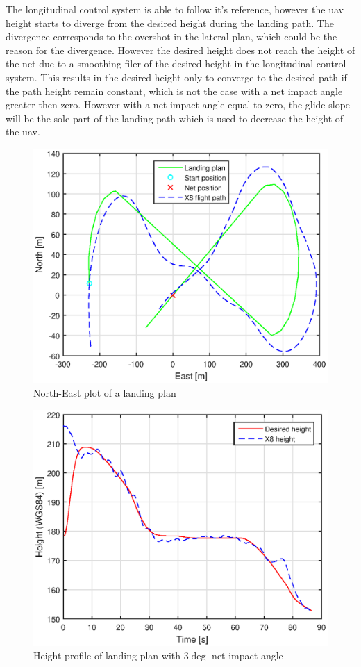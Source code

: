 The longitudinal control system is able to follow it's reference, however the \gls{uav} height starts to diverge from the desired height during the landing path. The divergence corresponds to the overshot in the lateral plan, which could be the reason for the divergence. However the desired height does not reach the height of the net due to a smoothing filer of the desired height in the longitudinal control system. This results in the desired height only to converge to the desired path if the path height remain constant, which is not the case with a net impact angle greater then zero. However with a net impact angle equal to zero, the glide slope will be the sole part of the landing path which is used to decrease the height of the \gls{uav}.
\newpage
\begin{figure}[H]
	\centering
		\includegraphics[scale=0.7]{figs/Experiment/NorthEast31mai103029.eps}
		\caption{North-East plot of a landing plan}
		\label{Fig:NorthEast31mai103029}
\end{figure}
\begin{figure}[H]
\centering
		\includegraphics[scale=0.7]{figs/Experiment/Height31mai103029.eps}
		\caption{Height profile of landing plan with $3 \deg$ net impact angle}
		\label{Fig:Height31mai103029}
\end{figure}
